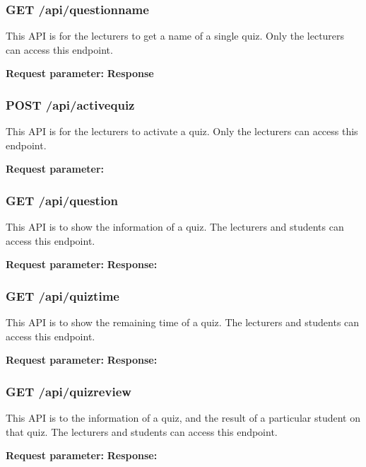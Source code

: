 \documentclass[a4paper, 11pt,openany]{book} %
\begin{document}
\subsubsection{GET /api/questionname}
This API is for the lecturers to get a name of a single quiz. Only the lecturers can access this endpoint. \par
\textbf{Request parameter:}
\textbf{Response}

\subsubsection{POST /api/activequiz}
This API is for the lecturers to activate a quiz. Only the lecturers can access this endpoint. \par
\textbf{Request parameter:}

\subsubsection{GET /api/question}
This API is to show the information of a quiz. The lecturers and students can access this endpoint. \par
\textbf{Request parameter:}
\textbf{Response:}

\subsubsection{GET /api/quiztime}
This API is to show the remaining time of a quiz. The lecturers and students can access this endpoint. \par
\textbf{Request parameter:}
\textbf{Response:}

\subsubsection{GET /api/quizreview}
This API is to the information of a quiz, and the result of a particular student on that quiz. The lecturers and students can access this endpoint. \par
\textbf{Request parameter:}
\textbf{Response:}
\end{document}
